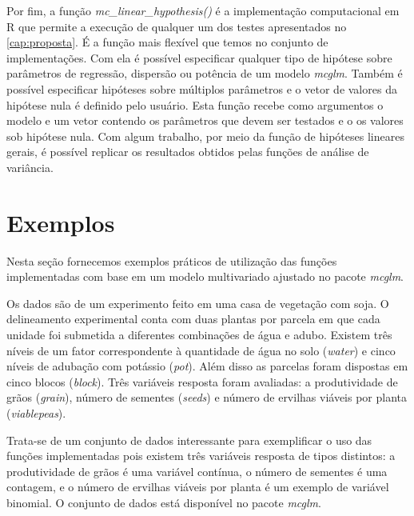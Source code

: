 Por fim, a função \emph{mc\_linear\_hypothesis()} é a implementação computacional em R que permite a execução de qualquer um dos testes apresentados no \autoref{cap:proposta}. É a função mais flexível que temos no conjunto de implementações. Com ela é possível especificar qualquer tipo de hipótese sobre parâmetros de regressão, dispersão ou potência de um modelo \emph{mcglm}. Também é possível especificar hipóteses sobre múltiplos parâmetros e o vetor de valores da hipótese nula é definido pelo usuário. Esta função recebe como argumentos o modelo e um vetor contendo os parâmetros que devem ser testados e o os valores sob hipótese nula. Com algum trabalho, por meio da função de hipóteses lineares gerais, é possível replicar os resultados obtidos pelas funções de análise de variância.



\section{Exemplos}

Nesta seção fornecemos exemplos práticos de utilização das funções implementadas com base em um modelo multivariado ajustado no pacote \emph{mcglm}.

Os dados são de um experimento feito em uma casa de vegetação com soja. O delineamento experimental conta com duas plantas por parcela em que cada unidade foi submetida a diferentes combinações de água e adubo. Existem três níveis de um fator correspondente à quantidade de água no solo (\emph{water}) e cinco níveis de adubação com potássio (\emph{pot}). Além disso as parcelas foram dispostas em cinco blocos (\emph{block}). Três variáveis resposta foram avaliadas: a produtividade de grãos (\emph{grain}), número de sementes (\emph{seeds}) e número de ervilhas viáveis por planta (\emph{viablepeas}).

Trata-se de um conjunto de dados interessante para exemplificar o uso das funções implementadas pois existem três variáveis resposta de tipos distintos: a produtividade de grãos é uma variável contínua, o número de sementes é uma contagem, e o número de ervilhas viáveis por planta é um exemplo de variável binomial. O conjunto de dados está disponível no pacote \emph{mcglm}.



\begin{knitrout}
\color{fgcolor}\begin{kframe}
\begin{alltt}
\end{alltt}
\end{kframe}
\end{knitrout}

